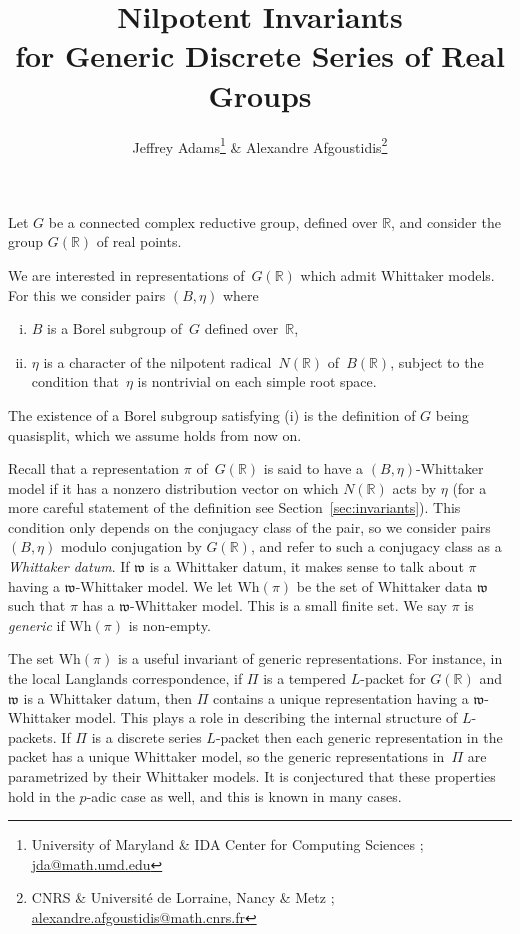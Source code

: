 \documentclass[10pt,leqno]{article}
\numberwithin{equation}{section}
\newcommand{\R}{\mathbb R}
\newcommand{\w}{\mathfrak w}
\newcommand{\Wh}{\mathrm{Wh}}
\begin{document}
\title{Nilpotent Invariants \\ for Generic Discrete Series of Real Groups}
\author{Jeffrey Adams\footnote{University of Maryland \& IDA Center for Computing Sciences ; \url{jda@math.umd.edu}} {} \& Alexandre Afgoustidis\footnote{CNRS \& Université de Lorraine, Nancy \& Metz ; \url{alexandre.afgoustidis@math.cnrs.fr}}}
\date{}

\maketitle

Let $G$ be a connected complex reductive group, defined over $\R$, and consider the group $G(\R)$ of real points. 

We are interested in representations of~$G(\R)$ which admit Whittaker models. For this we consider pairs $(B,\eta)$ where 
\begin{enumerate}[(i)]
\item $B$ is a Borel subgroup of~$G$ defined over~$\R$,
\item $\eta$ is a character of the nilpotent radical~$N(\R)$ of~$B(\R)$, subject to the condition that~$\eta$ is nontrivial on each simple root space.
\end{enumerate}
The existence of a Borel subgroup satisfying (i) is the definition of $G$ being quasisplit, which we assume holds from now on.

Recall that a representation $\pi$ of~$G(\R)$ is said to {have a $(B,\eta)$-Whittaker model} if it has a nonzero distribution vector on which $N(\R)$ acts by $\eta$ (for a more careful statement of the definition see Section~\ref{sec:invariants}).
This condition only depends on the conjugacy class of the pair, 
so we  consider pairs $(B,\eta)$ modulo conjugation by $G(\R)$, and refer to such a conjugacy class
as a {\it Whittaker datum}.
If $\w$ is a Whittaker datum, it makes sense to talk about $\pi$ having a $\w$-Whittaker model. We let $\Wh(\pi)$  be the set of
Whittaker data $\w$ such that $\pi$ has a $\w$-Whittaker model. This is a small finite set.
We say $\pi$ is {\it generic} if $\Wh(\pi)$ is non-empty.

The set $\Wh(\pi)$ is
a useful invariant of generic representations.
For instance, in the local Langlands correspondence, if $\Pi$ is a tempered $L$-packet for $G(\R)$ and $\w$ is a Whittaker datum, then $\Pi$ contains a unique representation
having a $\w$-Whittaker model. This plays a role in describing the internal structure of $L$-packets.
If $\Pi$ is a discrete series $L$-packet then each generic representation in the packet has a unique
Whittaker model, so the generic representations in~$\Pi$ are parametrized by their Whittaker models.
It is conjectured that these properties hold in the $p$-adic case as well, and this is known in many cases.
\end{document}
